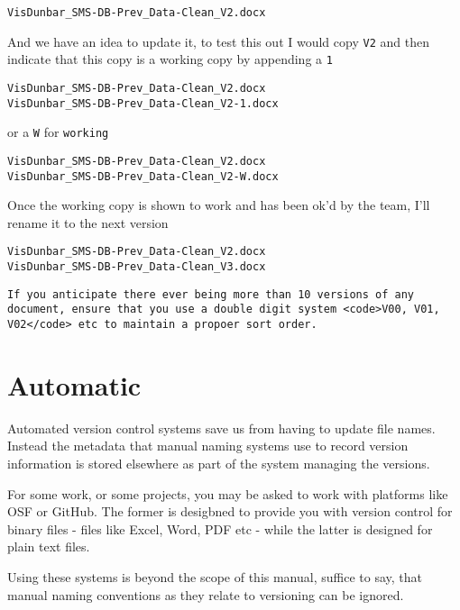 \documentclass[
]{book}
\begin{document}
\begin{verbatim}
VisDunbar_SMS-DB-Prev_Data-Clean_V2.docx
\end{verbatim}

And we have an idea to update it, to test this out I would copy \texttt{V2} and then indicate that this copy is a working copy by appending a \texttt{1}

\begin{verbatim}
VisDunbar_SMS-DB-Prev_Data-Clean_V2.docx
VisDunbar_SMS-DB-Prev_Data-Clean_V2-1.docx
\end{verbatim}

or a \texttt{W} for \texttt{working}

\begin{verbatim}
VisDunbar_SMS-DB-Prev_Data-Clean_V2.docx
VisDunbar_SMS-DB-Prev_Data-Clean_V2-W.docx
\end{verbatim}

Once the working copy is shown to work and has been ok'd by the team, I'll rename it to the next version

\begin{verbatim}
VisDunbar_SMS-DB-Prev_Data-Clean_V2.docx
VisDunbar_SMS-DB-Prev_Data-Clean_V3.docx
\end{verbatim}

\begin{verbatim}
If you anticipate there ever being more than 10 versions of any document, ensure that you use a double digit system <code>V00, V01, V02</code> etc to maintain a propoer sort order.
\end{verbatim}

\hypertarget{automatic}{%
\section*{Automatic}\label{automatic}}

Automated version control systems save us from having to update file names. Instead the metadata that manual naming systems use to record version information is stored elsewhere as part of the system managing the versions.

For some work, or some projects, you may be asked to work with platforms like OSF or GitHub. The former is desigbned to provide you with version control for binary files - files like Excel, Word, PDF etc - while the latter is designed for plain text files.

Using these systems is beyond the scope of this manual, suffice to say, that manual naming conventions as they relate to versioning can be ignored.
\end{document}

